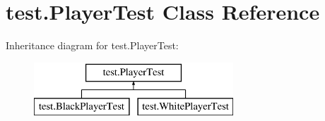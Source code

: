 \hypertarget{classtest_1_1_player_test}{}\section{test.\+Player\+Test Class Reference}
\label{classtest_1_1_player_test}
Inheritance diagram for test.\+Player\+Test\+:\begin{figure}[H]
\begin{center}
\leavevmode
\includegraphics[height=2.000000cm]{classtest_1_1_player_test}
\end{center}
\end{figure}
